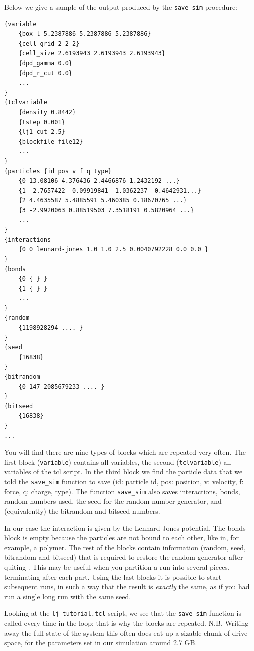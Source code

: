\documentclass[
paper=a4,                       %
fontsize=11pt,                  %
twoside,                        %
footsepline,                    %
headsepline,                    %
headinclude=false,              %
footinclude=false,              %
pagesize,                       %
]{scrartcl}
\begin{document}
\noindent Below we give a sample of the output produced by the \lstinline|save_sim| procedure:

{\small\vspace{0,2cm}
\begin{verbatim}
{variable 
	{box_l 5.2387886 5.2387886 5.2387886}
	{cell_grid 2 2 2}
	{cell_size 2.6193943 2.6193943 2.6193943}
	{dpd_gamma 0.0}
	{dpd_r_cut 0.0}
	...
}
{tclvariable 
	{density 0.8442}
	{tstep 0.001}
	{lj1_cut 2.5}
	{blockfile file12}
	...
}
{particles {id pos v f q type} 
	{0 13.08106 4.376436 2.4466876 1.2432192 ...}
	{1 -2.7657422 -0.09919841 -1.0362237 -0.4642931...}
	{2 4.4635587 5.4885591 5.460385 0.18670765 ...}
	{3 -2.9920063 0.88519503 7.3518191 0.5820964 ...}
	...
}
{interactions 
	{0 0 lennard-jones 1.0 1.0 2.5 0.0040792228 0.0 0.0 }
}
{bonds  
	{0 { } }
	{1 { } }
	...
}
{random 
	{1198928294 .... }
}
{seed 
	{16838}
}
{bitrandom 
	{0 147 2085679233 .... }
}	
{bitseed 
	{16838}
}
...
\end{verbatim}
\vspace{0,2cm}
}

\noindent You will find there are nine types of blocks which are repeated very often. The first block (\texttt{variable}) contains all \es{} variables, the second (\texttt{tclvariable}) all variables of the tcl script. In the third block we find the particle data that we told the \lstinline|save_sim| function to save (id: particle id, pos: position, v: velocity, f: force, q: charge, type). The function \lstinline|save_sim| also saves interactions, bonds, random numbers used, the seed for the random number generator, and (equivalently) the bitrandom and bitseed numbers. 

In our case the interaction is given by the Lennard-Jones potential. The bonds block is empty because the particles are not bound to each other, like in, for example, a polymer. The rest of the blocks contain information (random, seed, bitrandom and bitseed) that is required to restore the random generator after quiting \es{}. This may be useful when you partition a run into several pieces, terminating \es{} after each part. Using the last blocks it is possible to start subsequent runs, in such a way that the result is \emph{exactly} the same, as if you had run a single long run with the same seed.

Looking at the \texttt{lj\_tutorial.tcl} script, we see that the \lstinline|save_sim| function is called every time in the loop; that is why the blocks are repeated. N.B. Writing away the full state of the system this often does eat up a sizable chunk of drive space, for the parameters set in our simulation around 2.7 GB.
\end{document}
